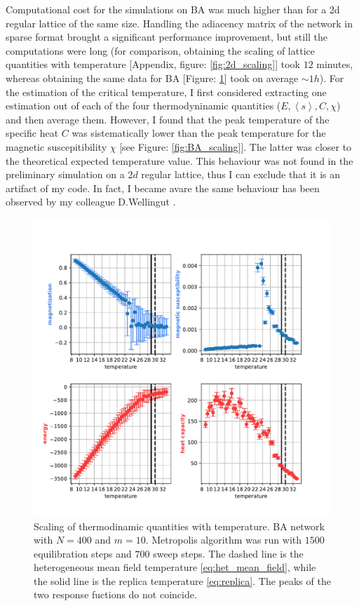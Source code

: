 Computational cost for the simulations on BA was much higher than for a 2d regular lattice of the same size. Handling the adiacency matrix of the network in sparse format brought a significant performance improvement, but still the computations were long (for comparison, obtaining the scaling of lattice quantities with temperature [Appendix, figure: \ref{fig:2d_scaling}] took $12$ minutes, whereas obtaining the same data for BA [Figure: \ref{fig:BA_scaling_m_10}] took on average $\sim 1h$). \medskip \newline \noindent
 For the estimation of the critical temperature, I first considered extracting one estimation out of each of the four thermodyninamic quantities ($E, \left\langle s \right\rangle , C, \chi$) and then average them. However, I found that the peak temperature of the specific heat $C$ was sistematically lower than the peak temperature for the magnetic suscepitibility $\chi$ [see Figure: \ref{fig:BA_scaling}]. The latter was closer to the theoretical expected temperature value. This behaviour was not found in the preliminary simulation on a $2d$ regular lattice, thus I can exclude that it is an artifact of my code. In fact, I became avare the same behaviour has been observed by my colleague D.Wellingut \cite{dw}.
\begin{figure}[H]
    \centering
    \includegraphics[width=0.85\linewidth]{latex_source/images/ising/BA_scaling_num_nodes_400_t_points_50_steps_700_m_10_ti_8.99_tf_32.95.pdf}
    \caption{Scaling of thermodinamic quantities with temperature. BA network with $N=400$ and $m=10$. Metropolis algorithm was run with $1500$ equilibration steps and $700$ sweep steps. The dashed line is the heterogeneous mean field temperature \ref{eq:het_mean_field}, while the solid line is the replica temperature \ref{eq:replica}. The peaks of the two response fuctions do not coincide.}
    \label{fig:BA_scaling_m_10}
\end{figure}
